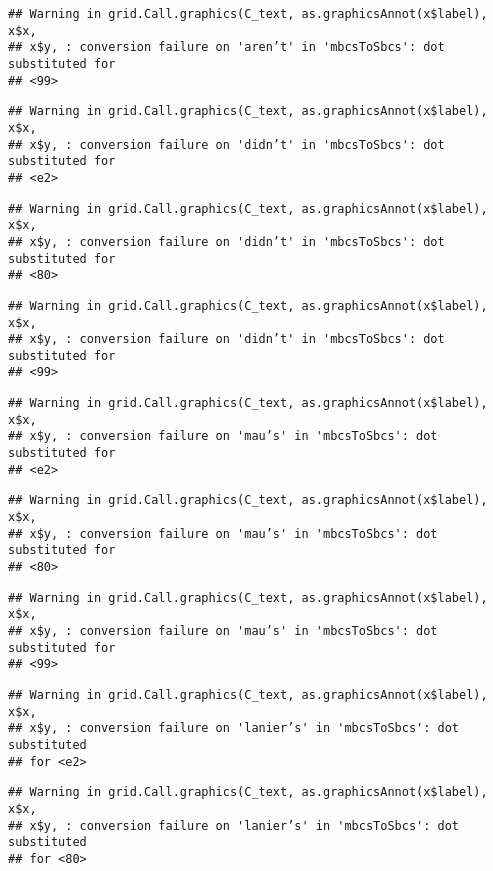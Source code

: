 \documentclass[]{article}
\begin{document}
\begin{verbatim}
## Warning in grid.Call.graphics(C_text, as.graphicsAnnot(x$label), x$x,
## x$y, : conversion failure on 'aren’t' in 'mbcsToSbcs': dot substituted for
## <99>
\end{verbatim}

\begin{verbatim}
## Warning in grid.Call.graphics(C_text, as.graphicsAnnot(x$label), x$x,
## x$y, : conversion failure on 'didn’t' in 'mbcsToSbcs': dot substituted for
## <e2>
\end{verbatim}

\begin{verbatim}
## Warning in grid.Call.graphics(C_text, as.graphicsAnnot(x$label), x$x,
## x$y, : conversion failure on 'didn’t' in 'mbcsToSbcs': dot substituted for
## <80>
\end{verbatim}

\begin{verbatim}
## Warning in grid.Call.graphics(C_text, as.graphicsAnnot(x$label), x$x,
## x$y, : conversion failure on 'didn’t' in 'mbcsToSbcs': dot substituted for
## <99>
\end{verbatim}

\begin{verbatim}
## Warning in grid.Call.graphics(C_text, as.graphicsAnnot(x$label), x$x,
## x$y, : conversion failure on 'mau’s' in 'mbcsToSbcs': dot substituted for
## <e2>
\end{verbatim}

\begin{verbatim}
## Warning in grid.Call.graphics(C_text, as.graphicsAnnot(x$label), x$x,
## x$y, : conversion failure on 'mau’s' in 'mbcsToSbcs': dot substituted for
## <80>
\end{verbatim}

\begin{verbatim}
## Warning in grid.Call.graphics(C_text, as.graphicsAnnot(x$label), x$x,
## x$y, : conversion failure on 'mau’s' in 'mbcsToSbcs': dot substituted for
## <99>
\end{verbatim}

\begin{verbatim}
## Warning in grid.Call.graphics(C_text, as.graphicsAnnot(x$label), x$x,
## x$y, : conversion failure on 'lanier’s' in 'mbcsToSbcs': dot substituted
## for <e2>
\end{verbatim}

\begin{verbatim}
## Warning in grid.Call.graphics(C_text, as.graphicsAnnot(x$label), x$x,
## x$y, : conversion failure on 'lanier’s' in 'mbcsToSbcs': dot substituted
## for <80>
\end{verbatim}
\end{document}
